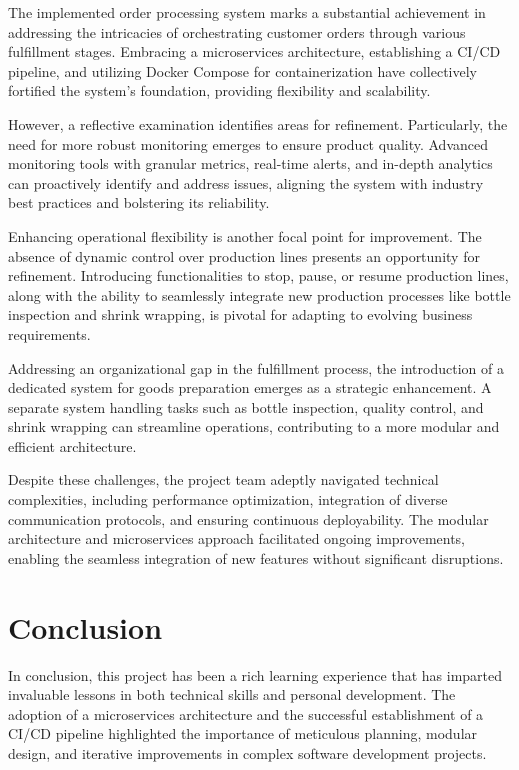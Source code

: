 \documentclass[conference, onecolumn]{IEEEtran}
\begin{document}
The implemented order processing system marks a substantial achievement in addressing the intricacies of orchestrating customer orders through various fulfillment stages. Embracing a microservices architecture, establishing a CI/CD pipeline, and utilizing Docker Compose for containerization have collectively fortified the system's foundation, providing flexibility and scalability.

However, a reflective examination identifies areas for refinement. Particularly, the need for more robust monitoring emerges to ensure product quality. Advanced monitoring tools with granular metrics, real-time alerts, and in-depth analytics can proactively identify and address issues, aligning the system with industry best practices and bolstering its reliability.

Enhancing operational flexibility is another focal point for improvement. The absence of dynamic control over production lines presents an opportunity for refinement. Introducing functionalities to stop, pause, or resume production lines, along with the ability to seamlessly integrate new production processes like bottle inspection and shrink wrapping, is pivotal for adapting to evolving business requirements.

Addressing an organizational gap in the fulfillment process, the introduction of a dedicated system for goods preparation emerges as a strategic enhancement. A separate system handling tasks such as bottle inspection, quality control, and shrink wrapping can streamline operations, contributing to a more modular and efficient architecture.

Despite these challenges, the project team adeptly navigated technical complexities, including performance optimization, integration of diverse communication protocols, and ensuring continuous deployability. The modular architecture and microservices approach facilitated ongoing improvements, enabling the seamless integration of new features without significant disruptions.

\section{Conclusion}

In conclusion, this project has been a rich learning experience that has imparted invaluable lessons in both technical skills and personal development. The adoption of a microservices architecture and the successful establishment of a CI/CD pipeline highlighted the importance of meticulous planning, modular design, and iterative improvements in complex software development projects.
\end{document}

